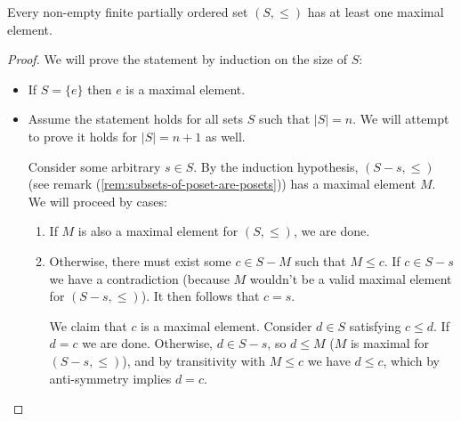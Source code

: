  \begin{lemma}\label{lem:non-empty-finite-posets-have-maximal-elements}
   Every non-empty finite partially ordered set $(S, \leq )$ has at least one maximal element. 
 \end{lemma}

 \begin{proof}
  We will prove the statement by induction on the size of $S$:
  \begin{itemize}
    \item If $S = \{e\}$ then $e$ is a maximal element.
    \item Assume the statement holds for all sets $S$ such that $|S| = n$. We will attempt to prove it holds for $|S| = n + 1$ as well. 

      Consider some arbitrary $s \in S$. By the induction hypothesis, $(S - s, \leq)$ (see remark (\ref{rem:subsets-of-poset-are-posets})) has a maximal element $M$. We will proceed by cases:
      \begin{enumerate}
        \item If $M$ is also a maximal element for $(S, \leq)$, we are done.
        \item Otherwise, there must exist some $c \in S - M$ such that $M \leq  c$. If $c \in S - s$ we have a contradiction (because $M$ wouldn't be a valid maximal element for $(S - s, \leq )$). It then follows that $c = s$. 

          We claim that $c$ is a maximal element. Consider $d \in S$ satisfying $c \leq d$. If $d = c$ we are done. Otherwise, $d \in S - s$, so $d \leq M$ ($M$ is maximal for $(S - s, \leq )$), and by transitivity with $M \leq c$ we have $d \leq c$, which by anti-symmetry implies $d = c$.
      \end{enumerate}
  \end{itemize}
 \end{proof}
